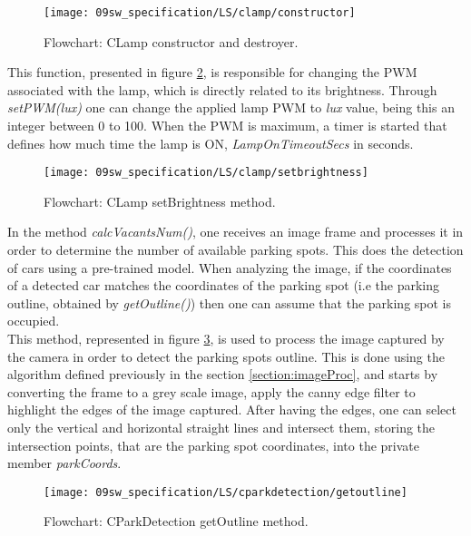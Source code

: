 \begin{figure}[H]
	\centering	
	\texttt{[image: 09sw\_specification/LS/clamp/constructor]}
	\caption{Flowchart: CLamp constructor and destroyer.}
	\label{fig:CLampconstructor}
\end{figure}

\clearpage
This function, presented in figure \ref{fig:CLampsetBrightness}, is responsible for changing the PWM associated with the lamp, which is directly related to its brightness. Through \textit{setPWM(lux)} one can change the applied lamp PWM to \textit{lux} value, being this an integer between 0 to 100. When the PWM is maximum, a timer is started that defines how much time the lamp is ON, \textit{LampOnTimeoutSecs} in seconds.

\begin{figure}[H]
	\centering	
	\texttt{[image: 09sw\_specification/LS/clamp/setbrightness]}
	\caption{Flowchart: CLamp setBrightness method.}
	\label{fig:CLampsetBrightness}
\end{figure}

\clearpage
{}

In the method \textit{calcVacantsNum()}, one receives an image frame and processes it in order to determine the number of available parking spots. This does the detection of cars using a pre-trained model. When analyzing the image, if the coordinates of a detected car matches the coordinates of the parking spot (i.e the parking outline, obtained by \textit{getOutline()}) then one can assume that the parking spot is occupied. \\

This method, represented in figure \ref{fig:CParkDetectiongetoutline}, is used to process the image captured by the camera in order to detect the parking spots outline. This is done using the algorithm defined previously in the section \ref{section:imageProc}, and starts by converting the frame to a grey scale image, apply the canny edge filter to highlight the edges of the image captured. After having the edges, one can select only the vertical and horizontal straight lines and intersect them, storing the intersection points, that are the parking spot coordinates, into the private member \textit{parkCoords}.

\begin{figure}[H]
	\centering			
	\texttt{[image: 09sw\_specification/LS/cparkdetection/getoutline]}
	\caption{Flowchart: CParkDetection getOutline method.}
	\label{fig:CParkDetectiongetoutline}
\end{figure}

